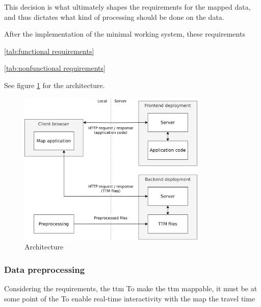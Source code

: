 This decision is what ultimately shapes the requirements for the mapped data,
and thus dictates what kind of processing should be done on the data.

After the implementation of the minimal working system, these requirements


\ref{tab:functional requirements}



\ref{tab:nonfunctional requirements}



See figure \ref{fig:architechture} for the architecture.

\begin{figure}[H]
	\centering
	\includegraphics[width=0.8\textwidth]{visual/figures/diagrams/architechture.png}
	\caption{Architecture}
	\label{fig:architechture}
\end{figure}

\subsubsection{Data preprocessing}
Considering the requirements, the \acrshort{ttm}
To make the \acrshort{ttm} mappable, it must be at some point of the
To enable real-time interactivity with the map the travel time




